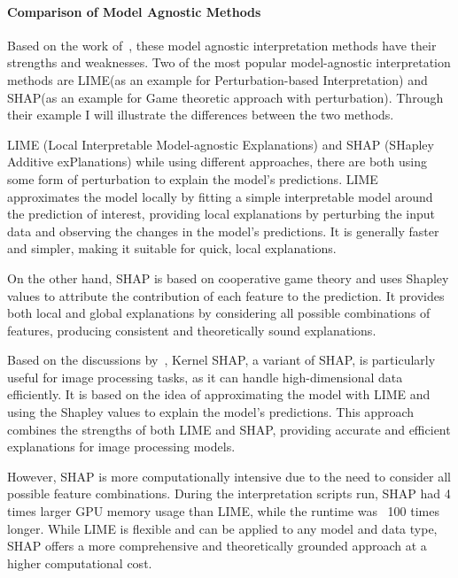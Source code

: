 \paragraph{Comparison of Model Agnostic Methods}\label{par:comparison-of-model-agnostic-methods}
Based on the work of~\cite{LIANG2021168}, these model agnostic interpretation methods have their strengths and weaknesses.
Two of the most popular model-agnostic interpretation methods are LIME(as an example for Perturbation-based Interpretation)
and SHAP(as an example for Game theoretic approach with perturbation).
Through their example I will illustrate the differences between the two methods.

LIME (Local Interpretable Model-agnostic Explanations) and SHAP (SHapley Additive exPlanations) while using
different approaches, there are both using some form of perturbation to explain the model's predictions.
LIME approximates the model locally by fitting a simple interpretable model around
the prediction of interest, providing local explanations by perturbing the input
data and observing the changes in the model's predictions.
It is generally faster and simpler, making it suitable for quick, local explanations.


On the other hand, SHAP is based on cooperative game theory and uses Shapley values to attribute the contribution of
each feature to the prediction.
It provides both local and global explanations by considering all possible combinations of features,
producing consistent and theoretically sound explanations.


Based on the discussions by~\cite{lundberg2017unifiedapproachinterpretingmodel}, Kernel SHAP, a variant of SHAP,
is particularly useful for image processing tasks, as it can handle high-dimensional data efficiently.
It is based on the idea of approximating the model with LIME and using the Shapley values to explain
the model's predictions.
This approach combines the strengths of both LIME and SHAP, providing accurate and efficient explanations for
image processing models.

However, SHAP is more computationally intensive due to the need to consider all possible feature combinations.
During the interpretation scripts run, SHAP had 4 times larger GPU memory usage than LIME, while the runtime was ~100 times longer.
While LIME is flexible and can be applied to any model and data type, SHAP offers a more comprehensive and theoretically
grounded approach at a higher computational cost.

